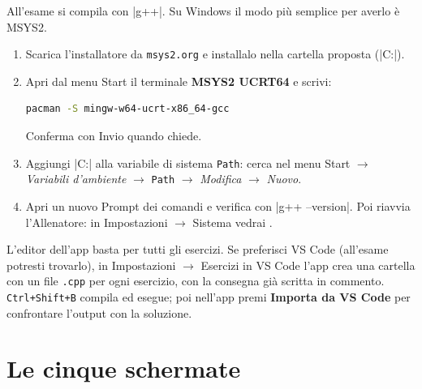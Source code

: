 All'esame si compila con \cc|g++|. Su Windows il modo più semplice per averlo è MSYS2.
\begin{passopasso}[: installare g++]
\begin{enumerate}
  \item Scarica l'installatore da \texttt{msys2.org} e installalo nella cartella proposta
        (\cc|C:|).
  \item Apri dal menu Start il terminale \textbf{MSYS2 UCRT64} e scrivi:
\begin{lstlisting}[language=bash]
pacman -S mingw-w64-ucrt-x86_64-gcc
\end{lstlisting}
        Conferma con Invio quando chiede.
  \item Aggiungi \cc|C:\bin| alla variabile di sistema \texttt{Path}:
        cerca  nel menu Start $\to$ \emph{Variabili d'ambiente}
        $\to$ \texttt{Path} $\to$ \emph{Modifica} $\to$ \emph{Nuovo}.
  \item Apri un nuovo Prompt dei comandi e verifica con \cc|g++ --version|. Poi
        riavvia l'Allenatore: in Impostazioni $\to$ Sistema vedrai .
\end{enumerate}
\end{passopasso}

\begin{consiglio}
L'editor dell'app basta per tutti gli esercizi. Se preferisci VS Code (all'esame potresti
trovarlo), in Impostazioni $\to$ Esercizi in VS Code l'app crea una cartella con un file
\texttt{.cpp} per ogni esercizio, con la consegna già scritta in commento.
\texttt{Ctrl+Shift+B} compila ed esegue; poi nell'app premi \textbf{Importa da VS Code}
per confrontare l'output con la soluzione.
\end{consiglio}

\section*{Le cinque schermate}

